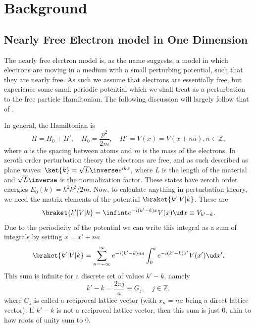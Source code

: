 \documentclass[main.tex]{subfiles}
\begin{document}
	
	\section{Background}
	\subsection{Nearly Free Electron model in One Dimension}\label{sec:nearly_free}
	The nearly free electron model is, as the name suggests, a model in which electrons are moving in a medium with a small perturbing potential, such that they are nearly free. As such we assume that electrons are essentially free, but experience some small periodic potential which we shall treat as a perturbation to the free particle Hamiltonian. The following discussion will largely follow that of \cite{simon}.
	
	In general, the Hamiltonian is
	\begin{equation}
		H = H_0 + H', \quad H_0 = \frac{p^2}{2m}, \quad H' = V(x) = V(x + na), n \in \mathbb{Z},
	\end{equation}
	where $ a $ is the spacing between atoms and $ m $ is the mass of the electrons. In zeroth order perturbation theory the electrons are free, and as such described as plane waves: $ \ket{k} = \sqrt{L}\inverse e^{ikx} $, where $ L $ is the length of the material and $ \sqrt{L}\inverse$ is the normalization factor. These states have zeroth order energies $ E_0(k)= \hbar^2 k^2/2m $. Now, to calculate anything in perturbation theory, we need the matrix elements of the potential $ \braket{k' | V | k} $. These are
	\begin{equation}
		\braket{k' | V | k} = \infint e^{-i(k'-k)x} V(x) \ud x \equiv V_{k'-k}.
	\end{equation}
	Due to the periodicity of the potential we can write this integral as a sum of integrals by setting $ x=x'+na $
	\begin{equation}
		\braket{k' | V | k} = \sum_{n = -\infty}^{\infty} e^{-i(k'-k) na} \int_{0}^{a} e^{-i(k'-k)x'} V(x')\ud x'.
	\end{equation}
	This sum is infinite for a discrete set of values $ k'-k $, namely
	\begin{equation}
		k'-k = \frac{2\pi j}{a} \equiv G_j, \quad j \in \mathbb{Z},
	\end{equation}
	where $ G_j $ is called a reciprocal lattice vector (with $ x_n=na $ being a direct lattice vector). If $ k'-k $ is not a reciprocal lattice vector, then this sum is just 0, akin to how roots of unity sum to 0.
	
\end{document}
